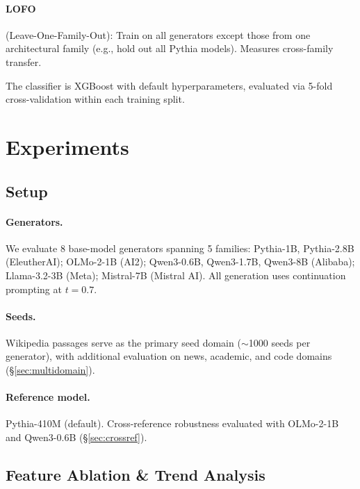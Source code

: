 \documentclass[11pt,twocolumn]{article}
\begin{document}
\paragraph{LOFO} (Leave-One-Family-Out): Train on all generators except those from one architectural family (e.g., hold out all Pythia models). Measures cross-family transfer.

The classifier is XGBoost with default hyperparameters, evaluated via 5-fold cross-validation within each training split.

\section{Experiments}

\subsection{Setup}

\paragraph{Generators.} We evaluate 8 base-model generators spanning 5 families: Pythia-1B, Pythia-2.8B (EleutherAI); OLMo-2-1B (AI2); Qwen3-0.6B, Qwen3-1.7B, Qwen3-8B (Alibaba); Llama-3.2-3B (Meta); Mistral-7B (Mistral AI).
All generation uses continuation prompting at $t = 0.7$.

\paragraph{Seeds.} Wikipedia passages serve as the primary seed domain ($\sim$1000 seeds per generator), with additional evaluation on news, academic, and code domains (\S\ref{sec:multidomain}).

\paragraph{Reference model.} Pythia-410M (default). Cross-reference robustness evaluated with OLMo-2-1B and Qwen3-0.6B (\S\ref{sec:crossref}).

\subsection{Feature Ablation \& Trend Analysis}
\label{sec:ablation}
\end{document}
